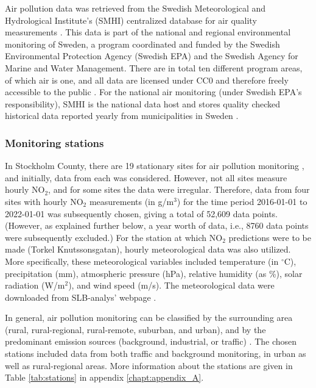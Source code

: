 Air pollution data was retrieved from the Swedish Meteorological and Hydrological Institute's (SMHI) centralized database for air quality measurements \cite{smhi-luftmatningar}. This data is part of the national and regional environmental monitoring of Sweden, a program coordinated and funded by the Swedish Environmental Protection Agency (Swedish EPA) and the Swedish Agency for Marine and Water Management. There are in total ten different program areas, of which air is one, and all data are licensed under CC0 and therefore freely accessible to the public \cite{naturvardsverket-miljodata}. For the national air monitoring (under Swedish EPA's responsibility), SMHI is the national data host and stores quality checked historical data reported yearly from municipalities in Sweden \cite{smhi-luftmatningar}.

\subsubsection{Monitoring stations}
In Stockholm County, there are 19 stationary sites for air pollution monitoring \cite{slb-matningar}, and initially, data from each was considered. However, not all sites measure hourly NO$_2$, and for some sites the data were irregular. Therefore, data from four sites with hourly NO$_2$ measurements (in \textmugreek g/m$^3$) for the time period 2016-01-01 to 2022-01-01 was subsequently chosen, giving a total of 52,609 data points. (However, as explained further below, a year worth of data, i.e., 8760 data points were subsequently excluded.) For the station at which NO$_2$ predictions were to be made (Torkel Knutssonsgatan), hourly meteorological data was also utilized. More specifically, these meteorological variables included temperature (in $^\circ$C), precipitation (mm), atmospheric pressure (hPa), relative humidity (as \%), solar radiation (W/m$^2$), and wind speed (m/s). The meteorological data were downloaded from SLB-analys' webpage \cite{slb-analys-meteorologi}. 

In general, air pollution monitoring can be classified by the surrounding area (rural, rural-regional, rural-remote, suburban, and urban), and by the predominant emission sources (background, industrial, or traffic) \cite{smhi-luftmatningar}. The chosen stations included data from both traffic and background monitoring, in urban as well as rural-regional areas. More information about the stations are given in Table \ref{tab:stations} in appendix \ref{chapt:appendix_A}. 

